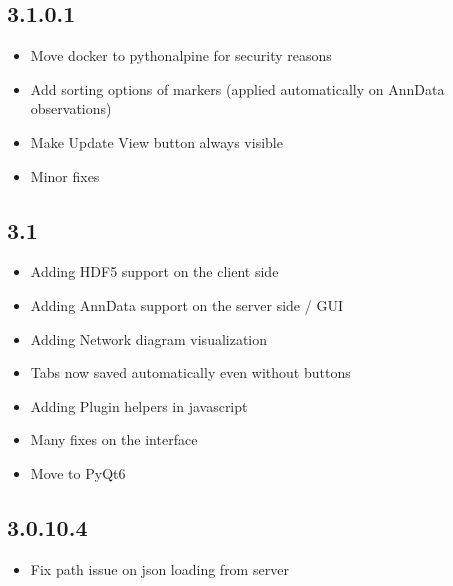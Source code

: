 \documentclass[letterpaper,10pt,english,openany,oneside]{sphinxmanual}
\begin{document}
\subsection{3.1.0.1}
\label{\detokenize{docs/intro/versions:id23}}\begin{itemize}
\item {} 
\sphinxAtStartPar
Move docker to python\sphinxhyphen{}alpine for security reasons

\item {} 
\sphinxAtStartPar
Add sorting options of markers (applied automatically on AnnData observations)

\item {} 
\sphinxAtStartPar
Make Update View button always visible

\item {} 
\sphinxAtStartPar
Minor fixes

\end{itemize}


\subsection{3.1}
\label{\detokenize{docs/intro/versions:id24}}\begin{itemize}
\item {} 
\sphinxAtStartPar
Adding HDF5 support on the client side

\item {} 
\sphinxAtStartPar
Adding AnnData support on the server side / GUI

\item {} 
\sphinxAtStartPar
Adding Network diagram visualization

\item {} 
\sphinxAtStartPar
Tabs now saved automatically even without buttons

\item {} 
\sphinxAtStartPar
Adding Plugin helpers in javascript

\item {} 
\sphinxAtStartPar
Many fixes on the interface

\item {} 
\sphinxAtStartPar
Move to PyQt6

\end{itemize}


\subsection{3.0.10.4}
\label{\detokenize{docs/intro/versions:id25}}\begin{itemize}
\item {} 
\sphinxAtStartPar
Fix path issue on json loading from server

\end{itemize}
\end{document}
